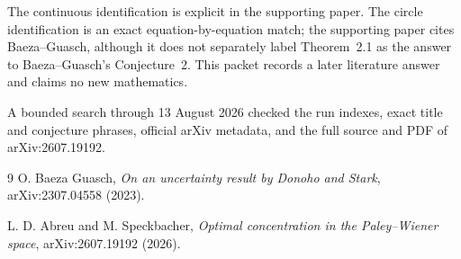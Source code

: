 \documentclass[11pt]{article}
\begin{document}
The continuous identification is explicit in the supporting paper.  The
circle identification is an exact equation-by-equation match; the supporting
paper cites Baeza--Guasch, although it does not separately label Theorem~2.1
as the answer to Baeza--Guasch's Conjecture~2.  This packet records a later
literature answer and claims no new mathematics.

A bounded search through 13 August 2026 checked the run indexes, exact title
and conjecture phrases, official arXiv metadata, and the full source and PDF of
arXiv:2607.19192.

\begin{thebibliography}{9}
O. Baeza Guasch,
\emph{On an uncertainty result by Donoho and Stark},
arXiv:2307.04558 (2023).

L. D. Abreu and M. Speckbacher,
\emph{Optimal concentration in the Paley--Wiener space},
arXiv:2607.19192 (2026).
\end{thebibliography}
\end{document}
